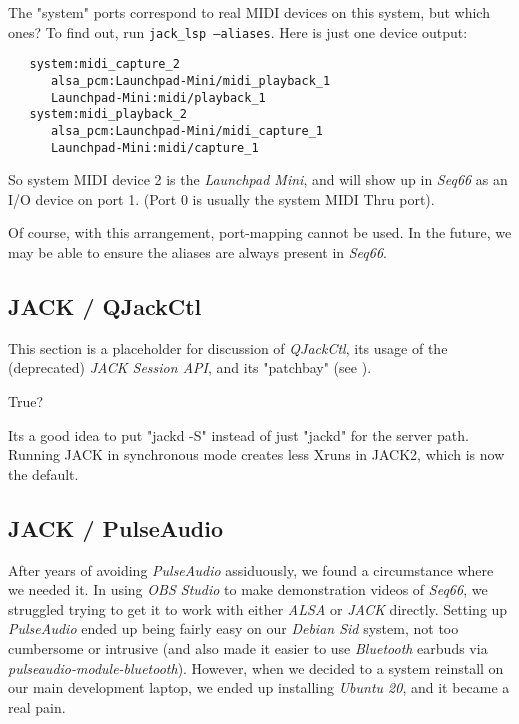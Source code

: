   The "system" ports correspond to real MIDI devices on this system, but which
   ones?  To find out, run \texttt{jack\_lsp --aliases}.  Here is just one
   device output:

   \begin{verbatim}
   system:midi_capture_2
      alsa_pcm:Launchpad-Mini/midi_playback_1
      Launchpad-Mini:midi/playback_1
   system:midi_playback_2
      alsa_pcm:Launchpad-Mini/midi_capture_1
      Launchpad-Mini:midi/capture_1
   \end{verbatim}

   So system MIDI device 2 is the \textsl{Launchpad Mini}, and
   will show up in \textsl{Seq66} as an I/O device on port 1.
   (Port 0 is usually the system MIDI Thru port).

   Of course, with this arrangement, port-mapping cannot be used.
   In the future, we may be able to ensure the aliases are always
   present in \textsl{Seq66}.

\subsection{JACK / QJackCtl}
\label{subsec:jack_qjackctl}

   This section is a placeholder for discussion of \textsl{QJackCtl},
   its usage of the (deprecated) \textsl{JACK Session API}, and
   its "patchbay" (see \cite{patchbay}).

   True?

   Its a good idea to put "jackd -S" instead of just "jackd" for the server
   path. Running JACK in synchronous mode creates less Xruns in JACK2, which
   is now the default.

\subsection{JACK / PulseAudio}
\label{subsec:jack_pulseaudio}

   After years of avoiding \textsl{PulseAudio} assiduously, we found a
   circumstance where we needed it.
   In using \textsl{OBS Studio} to make demonstration videos of \textsl{Seq66},
   we struggled trying to get it to work with either
   \textsl{ALSA} or \textsl{JACK} directly.
   Setting up \textsl{PulseAudio} ended up being fairly easy on our
   \textsl{Debian Sid} system, not too
   cumbersome or intrusive (and also made it easier to use
   \textsl{Bluetooth} earbuds via \textsl{pulseaudio-module-bluetooth}).
   However, when we decided to a system reinstall on our main development
   laptop, we ended up installing \textsl{Ubuntu 20}, and it became a real
   pain.

